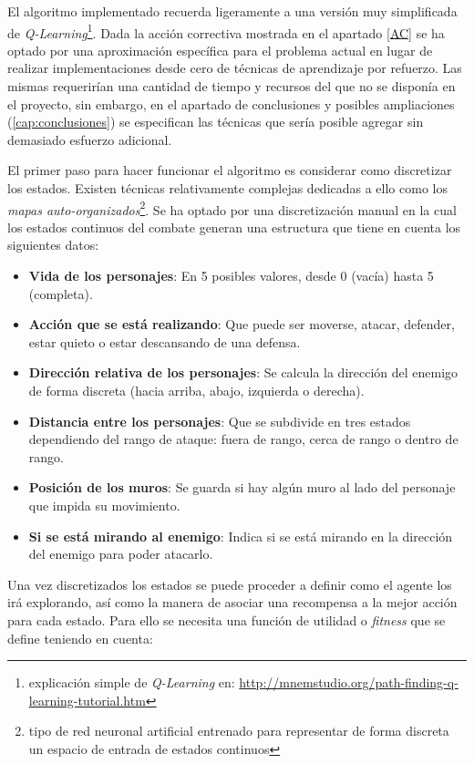 El algoritmo implementado recuerda ligeramente a una versión muy simplificada de \textit{Q-Learning}\footnote{explicación simple de \textit{Q-Learning} en: \url{http://mnemstudio.org/path-finding-q-learning-tutorial.htm}}. Dada la acción correctiva mostrada en el apartado \ref{AC} se ha optado por una aproximación específica para el problema actual en lugar de realizar implementaciones desde cero de técnicas de aprendizaje por refuerzo. Las mismas requerirían una cantidad de tiempo y recursos del que no se disponía en el proyecto, sin embargo, en el apartado de conclusiones y posibles ampliaciones (\ref{cap:conclusiones}) se especifican las técnicas que sería posible agregar sin demasiado esfuerzo adicional.

\bigskip

El primer paso para hacer funcionar el algoritmo es considerar como discretizar los estados. Existen técnicas relativamente complejas dedicadas a ello como los \textit{mapas auto-organizados}\footnote{tipo de red neuronal artificial entrenado para representar de forma discreta un espacio de entrada de estados continuos}. Se ha optado por una discretización manual en la cual los estados continuos del combate generan una estructura que tiene en cuenta los siguientes datos:

\begin{itemize}
	\item \textbf{Vida de los personajes}: En 5 posibles valores, desde 0 (vacía) hasta 5 (completa).
	\item \textbf{Acción que se está realizando}: Que puede ser moverse, atacar, defender, estar quieto o estar descansando de una defensa.
	\item \textbf{Dirección relativa de los personajes}: Se calcula la dirección del enemigo de forma discreta (hacia arriba, abajo, izquierda o derecha).
	\item \textbf{Distancia entre los personajes}: Que se subdivide en tres estados dependiendo del rango de ataque: fuera de rango, cerca de rango o dentro de rango.
	\item \textbf{Posición de los muros}: Se guarda si hay algún muro al lado del personaje que impida su movimiento.
	\item \textbf{Si se está mirando al enemigo}: Indica si se está mirando en la dirección del enemigo para poder atacarlo.
\end{itemize}

Una vez discretizados los estados se puede proceder a definir como el agente los irá explorando, así como la manera de asociar una recompensa a la mejor acción para cada estado. Para ello se necesita una función de utilidad o \textit{fitness} que se define teniendo en cuenta:


